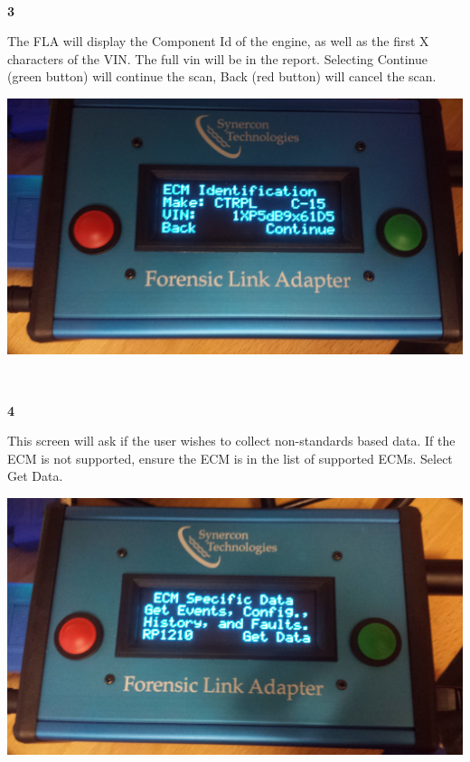 \documentclass[11pt]{article}
\begin{document}
\\[\baselineskip]
\noindent\begin{minipage}{0.3\textwidth}%
\begin{center}
\textbf{3}\\[\baselineskip]
\end{center}
The FLA will display the Component Id of the engine, as well as the first X characters of the VIN. The full vin will be in the report. Selecting Continue (green button) will continue the scan, Back (red button) will cancel the scan.
\end{minipage}%
\hfill%
\begin{minipage}{0.6\textwidth}
\includegraphics[width=\linewidth]{../../media/fla_screens/comp_id}
\end{minipage}
\\[\baselineskip]
\noindent\begin{minipage}{0.3\textwidth}%
\begin{center}
\textbf{4}\\[\baselineskip]
\end{center}
This screen will ask if the user wishes to collect non-standards based data. If the ECM is not supported, ensure the ECM is in the list of supported ECMs. Select Get Data.
\end{minipage}%
\hfill%
\begin{minipage}{0.6\textwidth}
\includegraphics[width=\linewidth]{../../media/fla_screens/ecm_confirm}
\end{minipage}
\end{document}
